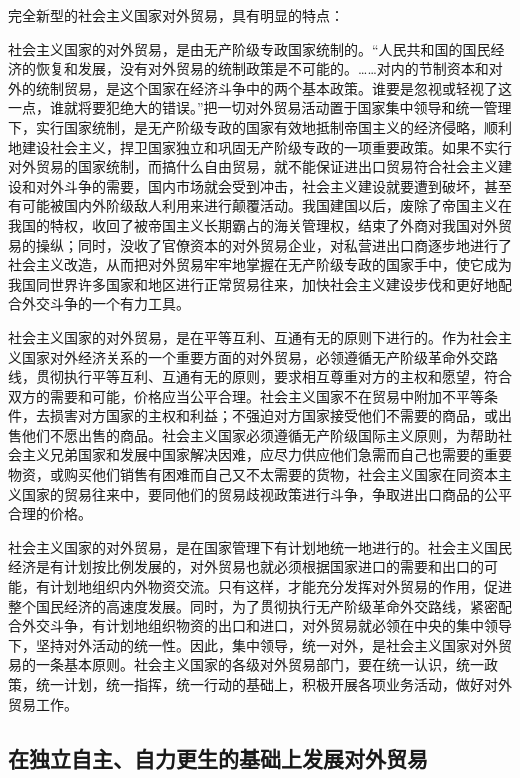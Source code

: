 \documentclass{book}
\begin{document}
完全新型的社会主义国家对外贸易，具有明显的特点：

社会主义国家的对外贸易，是由无产阶级专政国家统制的。“人民共和国的国民经济的恢复和发展，没有对外贸易的统制政策是不可能的。……对内的节制资本和对外的统制贸易，是这个国家在经济斗争中的两个基本政策。谁要是忽视或轻视了这一点，谁就将要犯绝大的错误。”把一切对外贸易活动置于国家集中领导和统一管理下，实行国家统制，是无产阶级专政的国家有效地抵制帝国主义的经济侵略，顺利地建设社会主义，捍卫国家独立和巩固无产阶级专政的一项重要政策。如果不实行对外贸易的国家统制，而搞什么自由贸易，就不能保证进出口贸易符合社会主义建设和对外斗争的需要，国内市场就会受到冲击，社会主义建设就要遭到破坏，甚至有可能被国内外阶级敌人利用来进行颠覆活动。我国建国以后，废除了帝国主义在我国的特权，收回了被帝国主义长期霸占的海关管理权，结束了外商对我国对外贸易的操纵；同时，没收了官僚资本的对外贸易企业，对私营进出口商逐步地进行了社会主义改造，从而把对外贸易牢牢地掌握在无产阶级专政的国家手中，使它成为我国同世界许多国家和地区进行正常贸易往来，加快社会主义建设步伐和更好地配合外交斗争的一个有力工具。

社会主义国家的对外贸易，是在平等互利、互通有无的原则下进行的。作为社会主义国家对外经济关系的一个重要方面的对外贸易，必领遵循无产阶级革命外交路线，贯彻执行平等互利、互通有无的原则，要求相互尊重对方的主权和愿望，符合双方的需要和可能，价格应当公平合理。社会主义国家不在贸易中附加不平等条件，去损害对方国家的主权和利益；不强迫对方国家接受他们不需要的商品，或出售他们不愿出售的商品。社会主义国家必须遵循无产阶级国际主义原则，为帮助社会主义兄弟国家和发展中国家解决因难，应尽力供应他们急需而自己也需要的重要物资，或购买他们销售有困难而自己又不太需要的货物，社会主义国家在同资本主义国家的贸易往来中，要同他们的贸易歧视政策进行斗争，争取进出口商品的公平合理的价格。

社会主义国家的对外贸易，是在国家管理下有计划地统一地进行的。社会主义国民经济是有计划按比例发展的，对外贸易也就必须根据国家进口的需要和出口的可能，有计划地组织内外物资交流。只有这样，才能充分发挥对外贸易的作用，促进整个国民经济的高速度发展。同时，为了贯彻执行无产阶级革命外交路线，紧密配合外交斗争，有计划地组织物资的出口和进口，对外贸易就必领在中央的集中领导下，坚持对外活动的统一性。因此，集中领导，统一对外，是社会主义国家对外贸易的一条基本原则。社会主义国家的各级对外贸易部门，要在统一认识，统一政策，统一计划，统一指挥，统一行动的基础上，积极开展各项业务活动，做好对外贸易工作。

\subsection{在独立自主、自力更生的基础上发展对外贸易}
\end{document}
